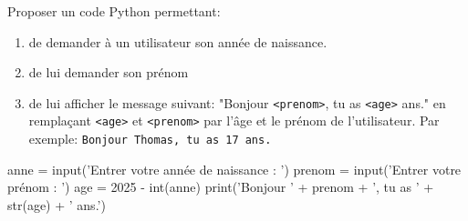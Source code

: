 \documentclass[a4paper,10pt]{report}
\def\ptsexoG{2}
\begin{document}
\exods{\ptsexoG}

Proposer un code Python permettant:

\begin{enumerate}
    \item de demander à un utilisateur son année de naissance.
    \item de lui demander son prénom
    \item de lui afficher le message suivant: "Bonjour \texttt{<prenom>}, tu as \texttt{<age>} ans." en remplaçant \verb|<age>| et \verb|<prenom>| par l'âge et le prénom de l'utilisateur. Par exemple:  \quad \verb|Bonjour Thomas, tu as 17 ans.|
    \end{enumerate}
    
\begin{CodePythontexAlt}[TaillePolice=\large,Largeur=1\linewidth,Centre,PremLigne=1]{}
anne = input('Entrer votre année de naissance : ')
prenom = input('Entrer votre prénom : ')
age = 2025 - int(anne)
print('Bonjour ' + prenom + ', tu as ' + str(age) + ' ans.')
\end{CodePythontexAlt}
\end{document}
